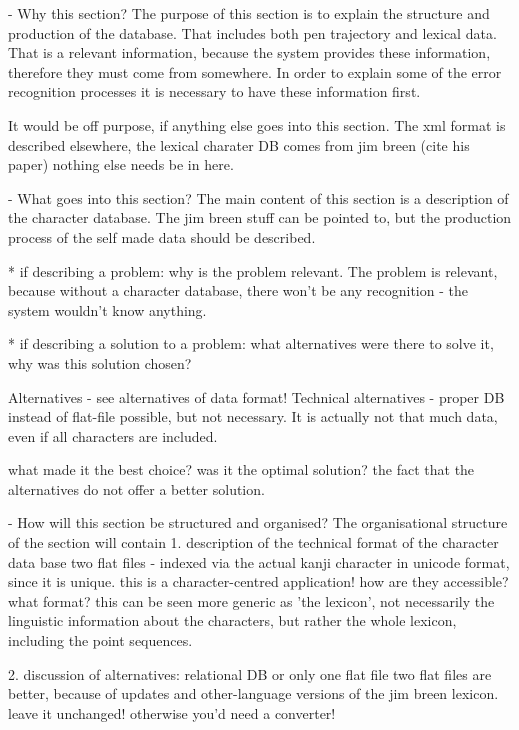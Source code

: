 - Why this section? 
  The purpose of this section is to explain the structure and production of 
  the database.   That includes both pen trajectory and lexical data.
  That is a relevant information, because the system provides these information,
  therefore they must come from somewhere. In order to explain some of the
  error recognition processes it is necessary to have these information first.

  It would be off purpose, if anything else goes into this section.
  The xml format is described elsewhere, the lexical charater DB comes from 
  jim breen (cite his paper) nothing else needs be in here.

- What goes into this section?
  The main content of this section is a description of the character database.
  The jim breen stuff can be pointed to, but the production process of the 
  self made data should be described.

  * if describing a problem: why is the problem relevant.
    The problem is relevant, because without a character database, there won't
    be any recognition - the system wouldn't know anything.

  * if describing a solution to a problem: what alternatives were
    there to solve it, why was this solution chosen? 

    Alternatives - see alternatives of data format!
    Technical alternatives - proper DB instead of flat-file possible,
    but not necessary. It is actually not that much data,
    even if all characters are included.
   
    what made it the best choice? was it the optimal solution?
    the fact that the alternatives do not offer a better solution.

- How will this section be structured and organised?
  The organisational structure of the section will contain
  1. description of the technical format of the character data base
     two flat files - indexed via the actual kanji character in unicode
     format, since it is unique. this is a character-centred application!
     how are they accessible? what format?
     this can be seen more generic as 'the lexicon', not necessarily
     the linguistic information about the characters, 
     but rather the whole lexicon, including the point sequences.

  2. discussion of alternatives: relational DB or only one flat file
     two flat files are better, because of updates and other-language versions
     of the jim breen lexicon. leave it unchanged! otherwise you'd need a
     converter!

